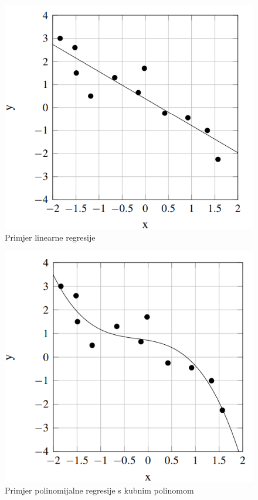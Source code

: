 \documentclass[times, utf8, zavrsni]{fer}
\begin{document}
\begin{figure}[H]
    \centering
    \includegraphics[scale=0.75]{img/linear-regression.png}
    \caption[Caption for LOF]{Primjer linearne regresije\footnotemark}
    \label{fig:linear-regression}
\end{figure}

\begin{figure}[H]
    \centering
    \includegraphics[scale=0.75]{img/polynom-regression.png}
    \caption[Caption for LOF]{Primjer polinomijalne regresije s kubnim polinomom\footnotemark}
    \label{fig:polynom-regression}
\end{figure}
\end{document}
